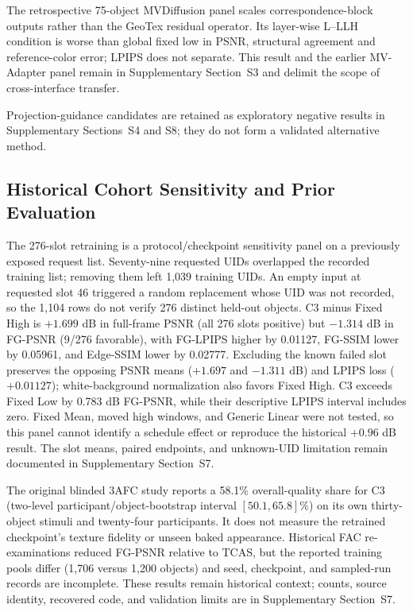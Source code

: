 \documentclass[times,twocolumn,final]{elsarticle}
\begin{document}
The retrospective 75-object MVDiffusion panel scales correspondence-block outputs rather than the GeoTex residual operator. Its layer-wise L--LLH condition is worse than global fixed low in PSNR, structural agreement and reference-color error; LPIPS does not separate. This result and the earlier MV-Adapter panel remain in Supplementary Section~S3 and delimit the scope of cross-interface transfer.

Projection-guidance candidates are retained as exploratory negative results in Supplementary Sections~S4 and S8; they do not form a validated alternative method.

\subsection{Historical Cohort Sensitivity and Prior Evaluation}
\label{subsec:original276}

The 276-slot retraining is a protocol/checkpoint sensitivity panel on a previously exposed request list. Seventy-nine requested UIDs overlapped the recorded training list; removing them left 1,039 training UIDs. An empty input at requested slot 46 triggered a random replacement whose UID was not recorded, so the 1,104 rows do not verify 276 distinct held-out objects. C3 minus Fixed High is $+1.699$ dB in full-frame PSNR (all 276 slots positive) but $-1.314$ dB in FG-PSNR (9/276 favorable), with FG-LPIPS higher by 0.01127, FG-SSIM lower by 0.05961, and Edge-SSIM lower by 0.02777. Excluding the known failed slot preserves the opposing PSNR means ($+1.697$ and $-1.311$ dB) and LPIPS loss ($+0.01127$); white-background normalization also favors Fixed High. C3 exceeds Fixed Low by 0.783 dB FG-PSNR, while their descriptive LPIPS interval includes zero. Fixed Mean, moved high windows, and Generic Linear were not tested, so this panel cannot identify a schedule effect or reproduce the historical $+0.96$ dB result. The slot means, paired endpoints, and unknown-UID limitation remain documented in Supplementary Section~S7.

The original blinded 3AFC study reports a 58.1\% overall-quality share for C3 (two-level participant/object-bootstrap interval $[50.1,65.8]\%$) on its own thirty-object stimuli and twenty-four participants. It does not measure the retrained checkpoint's texture fidelity or unseen baked appearance. Historical FAC re-examinations reduced FG-PSNR relative to TCAS, but the reported training pools differ (1,706 versus 1,200 objects) and seed, checkpoint, and sampled-run records are incomplete. These results remain historical context; counts, source identity, recovered code, and validation limits are in Supplementary Section~S7.
\end{document}
